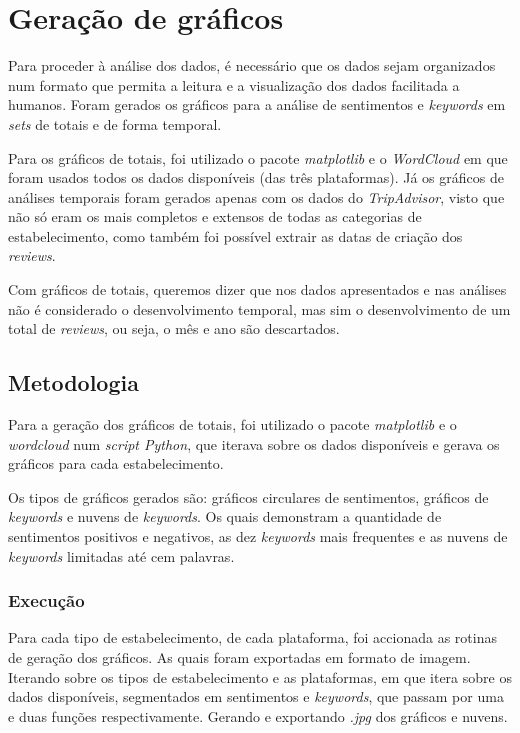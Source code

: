 \chapter{Geração de gráficos}
\label{cap5}

Para proceder à análise dos dados, é necessário que os dados sejam organizados num formato que permita a leitura e a visualização dos dados facilitada a humanos. Foram gerados os gráficos para a análise de sentimentos e \textit{keywords} em \textit{sets} de totais e de forma temporal.

Para os gráficos de totais, foi utilizado o pacote \textit{matplotlib} \cite{va1} e o \textit{WordCloud} \cite{gfg3} em que foram usados todos os dados disponíveis (das três plataformas). Já os gráficos de análises temporais foram gerados apenas com os dados do \textit{TripAdvisor}, visto que não só eram os mais completos e extensos de todas as categorias de estabelecimento, como também foi possível extrair as datas de criação dos \textit{reviews}.

Com gráficos de totais, queremos dizer que nos dados apresentados e nas análises não é considerado o desenvolvimento temporal, mas sim o desenvolvimento de um total de \textit{reviews}, ou seja, o mês e ano são descartados.

\section{Metodologia}

Para a geração dos gráficos de totais, foi utilizado o pacote \textit{matplotlib} \cite{va1} e o \textit{wordcloud} \cite{gfg3} num \textit{script Python}, que iterava sobre os dados disponíveis e gerava os gráficos para cada estabelecimento.

Os tipos de gráficos gerados são: gráficos circulares de sentimentos, gráficos de \textit{keywords} e nuvens de \textit{keywords}. Os quais demonstram a quantidade de sentimentos positivos e negativos, as dez \textit{keywords} mais frequentes e as nuvens de \textit{keywords} limitadas até cem palavras.

\subsection{Execução}

Para cada tipo de estabelecimento, de cada plataforma, foi accionada as rotinas de geração dos gráficos. As quais foram exportadas em formato de imagem. Iterando sobre os tipos de estabelecimento e as plataformas, em que itera sobre os dados disponíveis, segmentados em sentimentos e \textit{keywords}, que passam por uma e duas funções respectivamente. Gerando e exportando \textit{.jpg} dos gráficos e nuvens.


